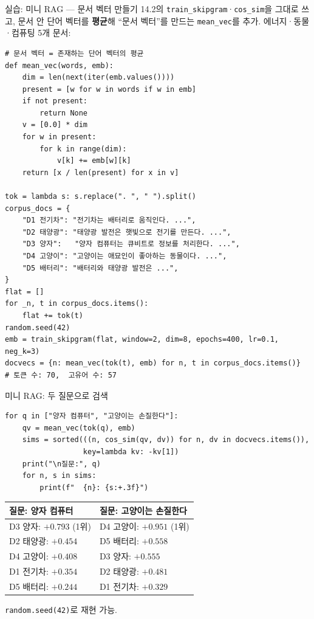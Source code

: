 \documentclass[aspectratio=169,11pt]{beamer}
\begin{document}
\begin{frame}[fragile]{실습: 미니 RAG --- 문서 벡터 만들기}
  14.2의 \texttt{train\_skipgram}·\texttt{cos\_sim}을 그대로 쓰고,
  문서 안 단어 벡터를 \textbf{평균}해 ``문서 벡터''를 만드는
  \texttt{mean\_vec}를 추가. \; 에너지·동물·컴퓨팅 5개 문서:
\begin{lstlisting}
# 문서 벡터 = 존재하는 단어 벡터의 평균
def mean_vec(words, emb):
    dim = len(next(iter(emb.values())))
    present = [w for w in words if w in emb]
    if not present:
        return None
    v = [0.0] * dim
    for w in present:
        for k in range(dim):
            v[k] += emb[w][k]
    return [x / len(present) for x in v]

tok = lambda s: s.replace(". ", " ").split()
corpus_docs = {
    "D1 전기차": "전기차는 배터리로 움직인다. ...",
    "D2 태양광": "태양광 발전은 햇빛으로 전기를 만든다. ...",
    "D3 양자":   "양자 컴퓨터는 큐비트로 정보를 처리한다. ...",
    "D4 고양이": "고양이는 애묘인이 좋아하는 동물이다. ...",
    "D5 배터리": "배터리와 태양광 발전은 ...",
}
flat = []
for _n, t in corpus_docs.items():
    flat += tok(t)
random.seed(42)
emb = train_skipgram(flat, window=2, dim=8, epochs=400, lr=0.1, neg_k=3)
docvecs = {n: mean_vec(tok(t), emb) for n, t in corpus_docs.items()}
# 토큰 수: 70,  고유어 수: 57
\end{lstlisting}
\end{frame}

\begin{frame}[fragile]{미니 RAG: 두 질문으로 검색}
\begin{lstlisting}
for q in ["양자 컴퓨터", "고양이는 손질한다"]:
    qv = mean_vec(tok(q), emb)
    sims = sorted(((n, cos_sim(qv, dv)) for n, dv in docvecs.items()),
                  key=lambda kv: -kv[1])
    print("\n질문:", q)
    for n, s in sims:
        print(f"  {n}: {s:+.3f}")
\end{lstlisting}
  \small
  \begin{tabular}{@{}ll@{}}
    \toprule
    질문: 양자 컴퓨터 & 질문: 고양이는 손질한다 \\
    \midrule
    D3 양자: $+0.793$ \; (1위) & D4 고양이: $+0.951$ \; (1위) \\
    D2 태양광: $+0.454$ & D5 배터리: $+0.558$ \\
    D4 고양이: $+0.408$ & D3 양자: $+0.555$ \\
    D1 전기차: $+0.354$ & D2 태양광: $+0.481$ \\
    D5 배터리: $+0.244$ & D1 전기차: $+0.329$ \\
    \bottomrule
  \end{tabular}
  {\footnotesize \texttt{random.seed(42)}로 재현 가능.}
\end{frame}
\end{document}
